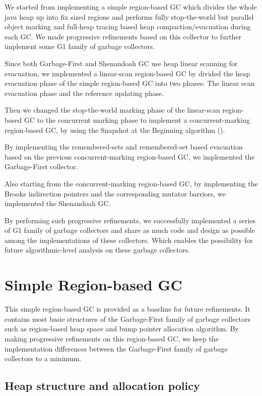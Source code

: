 We started from implementing a simple region-based GC which divides the whole java heap
up into fix sized regions and performs fully stop-the-world but parallel object marking
and full-heap tracing based heap compaction/evacuation during each GC.
We made progressive refinements based on this collector to further implement some G1 family of garbage collectors.

Since both Garbage-First and Shenandoah GC use heap linear scanning for evacuation,
we implemented a linear-scan region-based GC by divided the heap evacuation phase
of the simple region-based GC into two phases: The linear scan evacuation phase
and the reference updating phase.

Then we changed the stop-the-world marking phase of the linear-scan region-based GC
to the concurrent marking phase to implement a concurrent-marking region-based GC, 
by using the Snapshot at the Beginning algorithm (\cite{yuasa1990real}).

By implementing the remembered-sets and remembered-set based evacuation based on
the previous concurrent-marking region-based GC, we implemented the Garbage-First collector.

Also starting from the concurrent-marking region-based GC, by implementing the Brooks indirection pointers
and the corresponding mutator barriors, we implemented the Shenandoah GC.

By performing such progressive refinements, we successfully implemented a series of
G1 family of garbage collectors and share as much code and design as possible
among the implementations of these collectors. Which enables the possibility for future
algorithmic-level analysis on these garbage collectors.

\section{Simple Region-based GC}
\label{sec:simpleregiongc}

This simple region-based GC is provided as a baseline for future refinements. It contains
most basic structures of the Garbage-First family of garbage collectors such as
region-based heap space and bump pointer allocation algorithm. By making progressive refinements
on this region-based GC, we keep the implementation differences between the
Garbage-First family of garbage collectors to a minimum.

\subsection{Heap structure and allocation policy}

